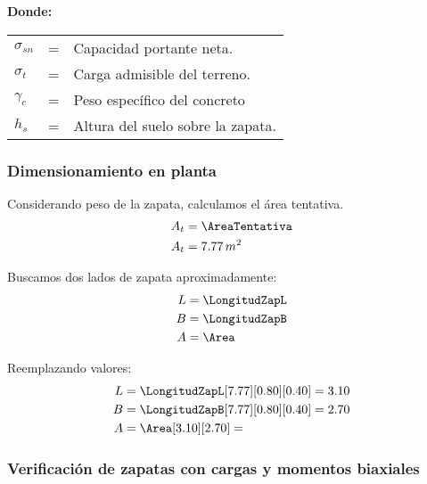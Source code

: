\documentclass{article}%
\begin{document}
\textbf{Donde:}

\begin{table}[h!]
    \centering
    \begin{tabular}{lll}
        $\sigma_{sn}$ &=&    Capacidad portante neta.\\
        $\sigma_t$ &=&   Carga admisible del terreno.\\
        $\gamma_c$ &=&    Peso específico del concreto\\
        $h_s$ &=&   Altura del suelo sobre la zapata.\\
    \end{tabular}
\end{table}

\newpage
\subsubsection{Dimensionamiento en planta}


Considerando peso de la zapata, calculamos el área tentativa.
\begin{align}
	A_t &= \AreaTentativa\\
	A_t &= 7.77 \, m^2\nonumber
\end{align}

Buscamos dos lados de zapata aproximadamente:
\begin{align}
	L &= \LongitudZapL \\
	B &= \LongitudZapB \\
	A &= \Area
\end{align}

Reemplazando valores:
\begin{align*}
	L &= \LongitudZapL[7.77][0.80][0.40] = 3.10\\
	B &= \LongitudZapB[7.77][0.80][0.40] = 2.70\\
	A &= \Area[3.10][2.70] = 
\end{align*}

\subsubsection{Verificación de zapatas con cargas y momentos biaxiales}
\end{document}
